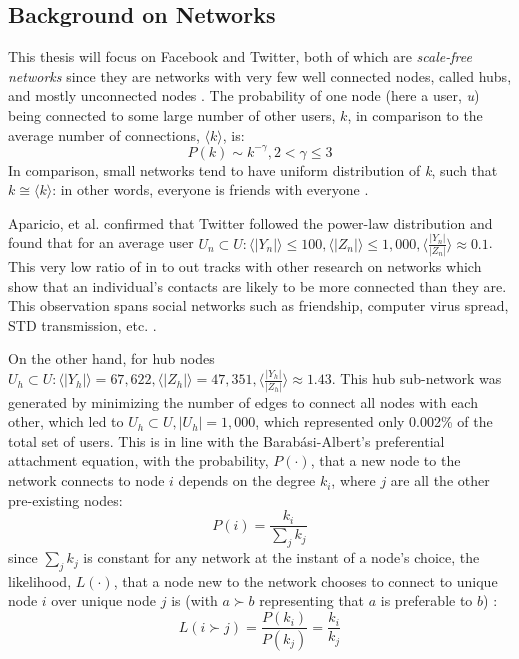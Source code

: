 \documentclass[preprint,review,12pt]{elsarticle}
\begin{document}
\subsection{Background on Networks}
\label{sec: Background on Networks}
This thesis will focus on Facebook and Twitter, both of which are \textit{scale-free networks} \cite{aparicio2015model,broido2019scale,barabasi2000scale} since they are networks with very few well connected nodes, called hubs, and mostly unconnected nodes \cite{barabasi2009scale,barabasi1999emergence,dorogovtsev2002evolution}. The probability of one node (here a user, \textit{u}) being connected to some large number of other users, $k$, in comparison to the average number of connections, $\langle k \rangle$, is: 
\begin{equation}
\label{powerlaw}
    P(k) \sim k^{-\gamma}, 2 < \gamma \leq 3
\end{equation}
In comparison, small networks tend to have uniform distribution of \textit{k}, such that $k \cong \langle k \rangle$: in other words, everyone is friends with everyone \cite{erdHos1960evolution,watts1998collective}.

Aparicio, et al. confirmed that Twitter followed the power-law distribution and found that for an average user $U_n \subset U:\langle | Y_n| \rangle \leq 100, \langle | Z_n| \rangle \leq 1,000, \langle \frac{|Y_n|}{|Z_n|}  \rangle \approx 0.1$. This very low ratio of in to out tracks with other research on networks which show that an individual's contacts are likely to be more connected than they are. This observation spans social networks such as friendship, computer virus spread, STD transmission, etc. \cite{feld1991your,newman2003ego,pastor2001epidemic,pastor2002epidemic,pastor2015epidemic,helleringer2007sexual,hethcote2014gonorrhea,liljeros2001web}.

On the other hand, for hub nodes $U_h \subset U: \langle | Y_h| \rangle = 67,622, \langle | Z_h| \rangle = 47,351, \langle  \frac{|Y_h|}{|Z_h|} \rangle \approx 1.43$. This hub sub-network was generated by minimizing the number of edges to connect all nodes with each other, which led to $U_h \subset U, |U_h| = 1,000$, which represented only 0.002\% of the total set of users. This is in line with the Barab{\'a}si-Albert's preferential attachment equation, with the probability, $P(\cdot)$, that a new node to the network connects to node $i$ depends on the degree $k_i$, where $j$ are all the other pre-existing nodes:
\begin{equation}
\label{preferentialequation}
    P(i)=\frac{k_i}{\sum_{j} k_j}
\end{equation}
since $\sum_{j} k_j$ is constant for any network at the instant of a node's choice, the likelihood, $L(\cdot)$, that a node new to the network chooses to connect to unique node $i$ over unique node $j$ is (with $a \succ b$ representing that $a$ is preferable to $b$) :
\begin{equation}
\label{likelihood equation}
    L(i \succ j)=\frac{P(k_i)}{P(k_j)} = \frac{k_i}{k_j}
\end{equation}
\end{document}
